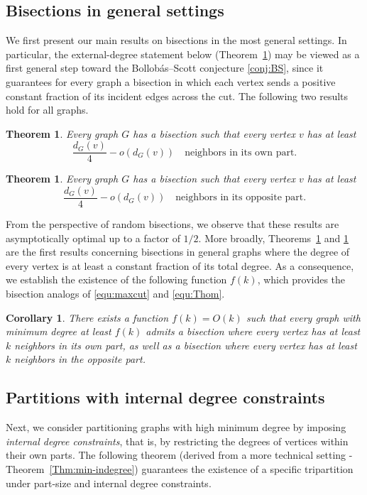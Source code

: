 \documentclass{aic}
\newtheorem{theorem}[dfn]{Theorem}
\newtheorem{corollary}[dfn]{Corollary}
\begin{document}
	
	\subsection{Bisections in general settings}
	\noindent
	We first present our main results on bisections in the most general settings.
	In particular, the external-degree statement below (Theorem~\ref{Thm:ext-bisec}) may be viewed as a first general step toward the Bollob\'as--Scott conjecture \eqref{conj:BS},
	since it guarantees for every graph a bisection in which each vertex sends a positive constant fraction of its incident edges across the cut.
	The following two results hold for all graphs.
	
	\begin{theorem}\label{Thm:int-bisec}
		Every graph $G$ has a bisection such that
		every vertex $v$ has at least $$\frac{d_G(v)}{4}-o(d_G(v)) \mbox{ ~ neighbors in its own part.}$$
	\end{theorem}
	
	\begin{theorem}\label{Thm:ext-bisec}
		Every graph $G$ has a bisection such that every vertex $v$ has at least
		$$\frac{d_G(v)}{4}-o(d_G(v)) \mbox{ ~ neighbors in its opposite part.}$$
	\end{theorem}
	
	From the perspective of random bisections, we observe that these results are asymptotically optimal up to a factor of $1/2$.
	More broadly, Theorems~\ref{Thm:int-bisec} and \ref{Thm:ext-bisec} are the first results concerning bisections in general graphs where the degree of every vertex is at least a constant fraction of its total degree.
	As a consequence, we establish the existence of the following function $f(k)$, which provides the bisection analogs of \eqref{equ:maxcut} and \eqref{equ:Thom}.
	
	\begin{corollary}\label{coro:main}
		There exists a function $f(k)=O(k)$ such that every graph with minimum degree at least $f(k)$ admits a bisection where every vertex has at least $k$ neighbors in its own part, as well as a bisection where every vertex has at least $k$ neighbors in the opposite part.
	\end{corollary}
	
	\subsection{Partitions with internal degree constraints}\label{subsec:intro-int}
	\noindent
	Next, we consider partitioning graphs with high minimum degree by imposing {\it internal degree constraints}, that is, by restricting the degrees of vertices within their own parts.
	The following theorem (derived from a more technical setting - Theorem~\ref{Thm:min-indegree}) guarantees the existence of a specific tripartition under part-size and internal degree constraints.
	
\end{document}
